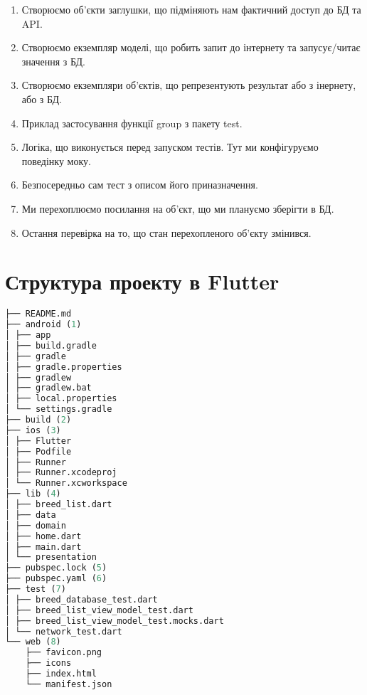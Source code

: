 \begin{enumerate}
    \item Створюємо об'єкти заглушки, що підміняють нам фактичний доступ до БД та API.
    \item Створюємо екземпляр моделі, що робить запит до інтернету та запусує/читає значення з БД.
    \item Створюємо екземпляри об'єктів, що репрезентують результат або з інернету, або з БД.
    \item Приклад застосування функції group з пакету test.
    \item Логіка, що виконується перед запуском тестів. Тут ми конфігуруємо поведінку моку.
    \item Безпосередньо сам тест з описом його приназначення.
    \item Ми перехоплюємо посилання на об'єкт, що ми плануємо зберігти в БД.
    \item Остання перевірка на то, що стан перехопленого об'єкту змінився.
\end{enumerate}

\section{Структура проекту в Flutter}
\label{section.3.7}

\begin{lstlisting}[style=light, language=Python,label={lst:flutter_project_layout},caption=Flutter Project Layout]
├── README.md
├── android (1)
│ ├── app
│ ├── build.gradle
│ ├── gradle
│ ├── gradle.properties
│ ├── gradlew
│ ├── gradlew.bat
│ ├── local.properties
│ └── settings.gradle
├── build (2)
├── ios (3)
│ ├── Flutter
│ ├── Podfile
│ ├── Runner
│ ├── Runner.xcodeproj
│ └── Runner.xcworkspace
├── lib (4)
│ ├── breed_list.dart
│ ├── data
│ ├── domain
│ ├── home.dart
│ ├── main.dart
│ └── presentation
├── pubspec.lock (5)
├── pubspec.yaml (6)
├── test (7)
│ ├── breed_database_test.dart
│ ├── breed_list_view_model_test.dart
│ ├── breed_list_view_model_test.mocks.dart
│ └── network_test.dart
└── web (8)
    ├── favicon.png
    ├── icons
    ├── index.html
    └── manifest.json
\end{lstlisting}

